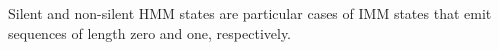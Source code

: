 \documentclass[a4paper]{article}
\theoremstyle{definition}
\theoremstyle{definition}
\newtheorem{definition}{Definition}[section]
\theoremstyle{definition}
\newcommand{\gv}{\;|\;}
\newcommand*{\field}[1]{\mathbb{#1}}%
\begin{document}
Silent and non-silent HMM states are particular cases of IMM states that emit sequences of length zero and one,
respectively.





\end{document}
